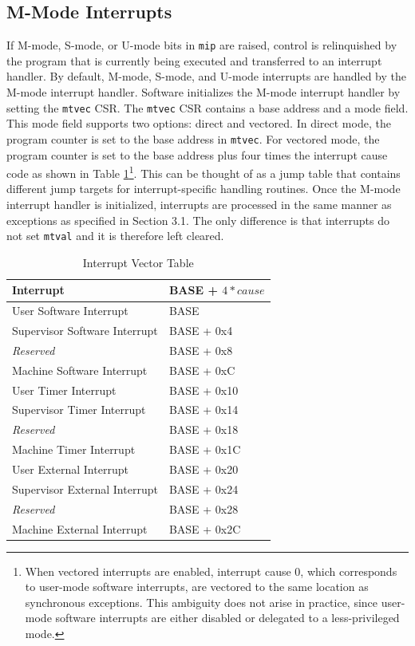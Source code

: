 \documentclass[12pt]{article}
\begin{document}
\subsection{M-Mode Interrupts}
If M-mode, S-mode, or U-mode bits in {\tt{mip}} are raised, control is relinquished by the program that is currently being executed and transferred to an interrupt handler. By default, M-mode, S-mode, and U-mode interrupts are handled by the M-mode interrupt handler. Software initializes the M-mode interrupt handler by setting the {\tt{mtvec}} CSR. The {\tt{mtvec}} CSR contains a base address and a mode field. This mode field supports two options: direct and vectored. In direct mode, the program counter is set to the base address in {\tt{mtvec}}. For vectored mode, the program counter is set to the base address plus four times the interrupt cause code as shown in Table \ref{interruptvectors}\footnote[4]{When vectored interrupts are enabled, interrupt cause 0, which corresponds to user-mode software interrupts, are vectored to the same location as synchronous exceptions. This ambiguity does not arise in practice, since user-mode software interrupts are either disabled or delegated to a less-privileged mode.}. This can be thought of as a jump table that contains different jump targets for interrupt-specific handling routines. Once the M-mode interrupt handler is initialized, interrupts are processed in the same manner as exceptions as specified in Section 3.1. The only difference is that interrupts do not set {\tt{mtval}} and it is therefore left cleared.

\begin{table}[h!]
\centering
\begin{tabular}{| l | l |}
\hline
Interrupt & BASE + $4*cause$ \\
\hline
User Software Interrupt & BASE \\
\hline
Supervisor Software Interrupt & BASE + 0x4 \\
\hline
\emph{Reserved} & BASE + 0x8 \\ 
\hline
Machine Software Interrupt & BASE + 0xC \\ 
\hline
User Timer Interrupt & BASE + 0x10 \\
\hline
Supervisor Timer Interrupt & BASE + 0x14 \\ 
\hline
\emph{Reserved} & BASE + 0x18 \\ 
\hline
Machine Timer Interrupt & BASE + 0x1C \\ 
\hline
User External Interrupt & BASE + 0x20 \\ 
\hline
Supervisor External Interrupt & BASE + 0x24 \\ 
\hline
\emph{Reserved} & BASE + 0x28 \\ 
\hline
Machine External Interrupt & BASE + 0x2C \\ 
\hline
\end{tabular}
\caption{Interrupt Vector Table}
\label{interruptvectors}
\end{table}
\end{document}
